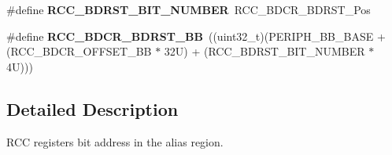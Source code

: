 \begin{DoxyCompactItemize}
\item 
\mbox{\label{group___r_c_c___bit_address___alias_region_ga68b0f7a13e733453c7efcd66a6ee251d}} 
\#define {\bfseries R\+C\+C\+\_\+\+B\+D\+R\+S\+T\+\_\+\+B\+I\+T\+\_\+\+N\+U\+M\+B\+ER}~R\+C\+C\+\_\+\+B\+D\+C\+R\+\_\+\+B\+D\+R\+S\+T\+\_\+\+Pos
\item 
\mbox{\label{group___r_c_c___bit_address___alias_region_ga5e5805d3c5b9ad3ebc13e030e5fdd86c}} 
\#define {\bfseries R\+C\+C\+\_\+\+B\+D\+C\+R\+\_\+\+B\+D\+R\+S\+T\+\_\+\+BB}~((uint32\+\_\+t)(P\+E\+R\+I\+P\+H\+\_\+\+B\+B\+\_\+\+B\+A\+SE + (R\+C\+C\+\_\+\+B\+D\+C\+R\+\_\+\+O\+F\+F\+S\+E\+T\+\_\+\+BB $\ast$ 32\+U) + (\+R\+C\+C\+\_\+\+B\+D\+R\+S\+T\+\_\+\+B\+I\+T\+\_\+\+N\+U\+M\+B\+E\+R $\ast$ 4\+U)))
\end{DoxyCompactItemize}


\subsection{Detailed Description}
R\+CC registers bit address in the alias region. 

